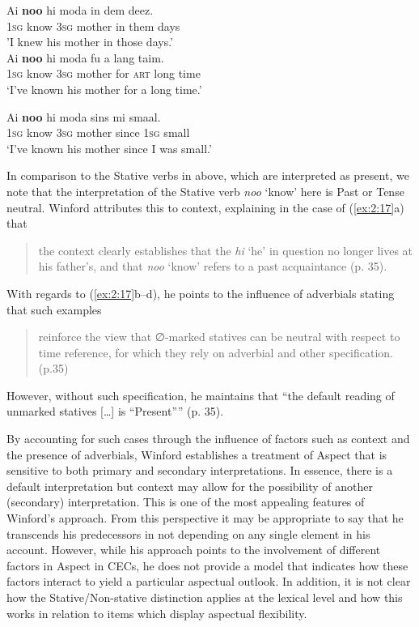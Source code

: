 \ex
\gll Ai                     \textbf{noo} hi                      moda    in dem      deez.\\
		\textsc{1sg} know \textsc{3sg} mother in them  days\\
		'I knew his mother in those days.'\\

\ex
\gll Ai                       \textbf{noo} hi                    moda      fu    a  lang taim.\\
		\textsc{1sg} know \textsc{3sg} mother for \textsc{art} long time\\
\glt `I’ve known his mother for a long time.'

\ex
\gll Ai  \textbf{noo} hi            moda        sins    mi                   smaal.\\
		\textsc{1sg} know \textsc{3sg}  mother     since   \textsc{1sg} small\\
\glt `I’ve known his mother since I was small.' 
\z \z

In comparison to the Stative verbs in  above, which are
interpreted as present, we note that the interpretation of the Stative
verb \textit{noo} `know' here is Past or Tense neutral.  Winford
attributes this to context, explaining in the case of (\ref{ex:2:17}a)
that

\begin{quote}
the context clearly establishes that the \textit{hi} `he' in question
no longer lives at his father’s, and that \textit{noo} `know' refers
to a past acquaintance (p. 35).
\end{quote}

With regards to (\ref{ex:2:17}b--d), he points to the influence of
adverbials stating that such examples

\begin{quote}
reinforce the view that ∅-marked statives can be neutral with respect
to time reference, for which they rely on adverbial and other
specification. (p.35)
\end{quote}

However, without such specification, he maintains that “the default
reading of unmarked statives […] is “Present”” (p. 35).

By accounting for such cases through the influence of factors such as
context and the presence of adverbials, Winford establishes a
treatment of Aspect that is sensitive to both primary and secondary
interpretations.  In essence, there is a default interpretation but
context may allow for the possibility of another (secondary)
interpretation.  This is one of the most appealing features of
Winford’s approach.  From this perspective it may be appropriate to
say that he transcends his predecessors in not depending on any single
element in his account.  However, while his approach points to the
involvement of different factors in Aspect in CECs, he does not
provide a model that indicates how these factors interact to yield a
particular aspectual outlook.  In addition, it is not clear how the
Stative\slash Non-stative distinction applies at the lexical level and how
this works in relation to items which display aspectual flexibility.

